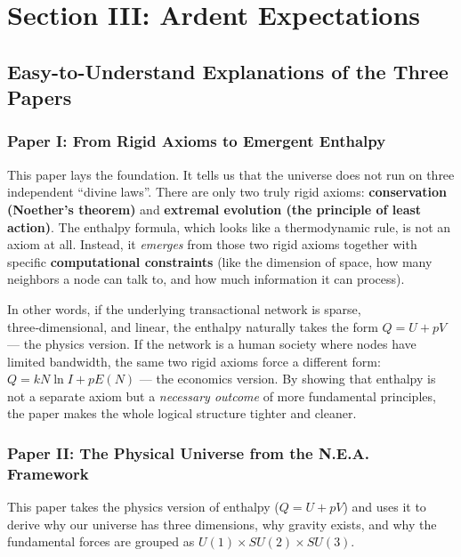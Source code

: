 \documentclass{article}
\begin{document}
\section*{Section III: Ardent Expectations}

\subsection*{Easy-to-Understand Explanations of the Three Papers}

\subsubsection*{Paper I: From Rigid Axioms to Emergent Enthalpy}

This paper lays the foundation. It tells us that the universe does not run on three independent “divine laws”. There are only two truly rigid axioms: \textbf{conservation (Noether’s theorem)} and \textbf{extremal evolution (the principle of least action)}. The enthalpy formula, which looks like a thermodynamic rule, is not an axiom at all. Instead, it \emph{emerges} from those two rigid axioms together with specific \textbf{computational constraints} (like the dimension of space, how many neighbors a node can talk to, and how much information it can process).

In other words, if the underlying transactional network is sparse, three‑dimensional, and linear, the enthalpy naturally takes the form \(Q = U + pV\) — the physics version. If the network is a human society where nodes have limited bandwidth, the same two rigid axioms force a different form: \(Q = k N \ln I + p E(N)\) — the economics version. By showing that enthalpy is not a separate axiom but a \emph{necessary outcome} of more fundamental principles, the paper makes the whole logical structure tighter and cleaner.

\subsubsection*{Paper II: The Physical Universe from the N.E.A. Framework}

This paper takes the physics version of enthalpy (\(Q = U + pV\)) and uses it to derive why our universe has three dimensions, why gravity exists, and why the fundamental forces are grouped as \(U(1) \times SU(2) \times SU(3)\).
\end{document}
